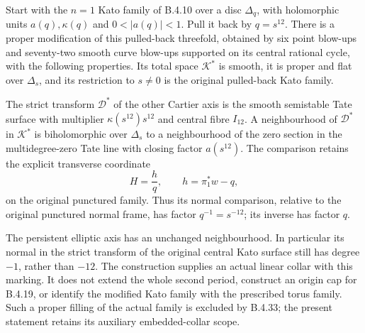 \begin{proposition}\label{push:src:B.4.21}
Start with the $n=1$ Kato family of B.4.10 over a disc
$\Delta_q$, with holomorphic units $a(q),\kappa(q)$ and
$0<|a(q)|<1$.  Pull it back by $q=s^{12}$.
There is a proper modification of this pulled-back threefold,
obtained by six point blow-ups and seventy-two smooth curve
blow-ups supported on its central rational cycle, with the
following properties.  Its total space $\mathcal K^*$ is smooth,
it is proper and flat over $\Delta_s$, and its restriction to
$s\ne0$ is the original pulled-back Kato family.

The strict transform $\mathcal D^*$ of the other Cartier axis
is the smooth semistable Tate surface with multiplier
$\kappa(s^{12})s^{12}$ and central fibre $I_{12}$.  A neighbourhood
of $\mathcal D^*$ in $\mathcal K^*$ is biholomorphic over
$\Delta_s$ to a neighbourhood of the zero section in the
multidegree-zero Tate line with closing factor $a(s^{12})$.
The comparison retains the explicit transverse coordinate
\[
 H=\frac{h}{q},\qquad h=\pi_1^*w-q,
 \tag{B.4.21.1}
\]
on the original punctured family.  Thus its normal comparison,
relative to the original punctured normal frame, has factor
$q^{-1}=s^{-12}$; its inverse has factor $q$.

The persistent elliptic axis has an unchanged neighbourhood.
In particular its normal in the strict transform of the original
central Kato surface still has degree $-1$, rather than $-12$.
The construction supplies an actual linear collar with this
marking.  It does not extend the whole second period, construct
an origin cap for B.4.19, or identify the modified Kato family
with the prescribed torus family. Such a proper filling of
the actual family is excluded by B.4.33; the present
statement retains its auxiliary embedded-collar scope.
\end{proposition}
